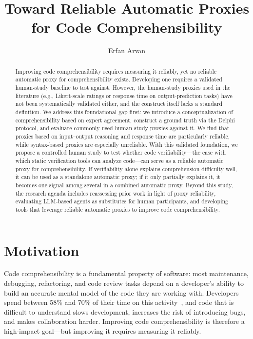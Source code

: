 \documentclass[sigplan,10pt,anonymous=false]{acmart}
\begin{document}
\title{Toward Reliable Automatic Proxies for Code Comprehensibility}

\author{Erfan Arvan}

\begin{abstract}
Improving code comprehensibility requires measuring it reliably, yet no
reliable automatic proxy for comprehensibility exists.
Developing one requires a validated human-study baseline to test against.
However, the human-study proxies used in the literature (e.g., Likert-scale
ratings or response time on output-prediction tasks) have not been
systematically validated either, and the construct itself lacks a standard
definition.
We address this foundational gap first: we introduce a conceptualization of
comprehensibility based on expert agreement, construct a ground truth via the
Delphi protocol, and evaluate commonly used human-study proxies against it.
We find that proxies based on input--output reasoning and response time are
particularly reliable, while syntax-based proxies are especially unreliable.
With this validated foundation, we propose a controlled human study to test
whether code verifiability---the ease with which static verification tools
can analyze code---can serve as a reliable automatic proxy for comprehensibility.
If verifiability alone explains comprehension difficulty well, it can be used
as a standalone automatic proxy; if it only partially explains it, it becomes
one signal among several in a combined automatic proxy.
Beyond this study, the research agenda includes reassessing prior work in
light of proxy reliability, evaluating LLM-based agents as substitutes for
human participants, and developing tools that leverage reliable automatic
proxies to improve code comprehensibility.
\end{abstract}

\maketitle

\section{Motivation}

Code comprehensibility is a fundamental property of software: most
maintenance, debugging, refactoring, and code review tasks depend on a
developer's ability to build an accurate mental model of the code they are
working with.
Developers spend between 58\% and 70\% of their time on this
activity~\cite{percent1,scalabrino2017automatically}, and code that is
difficult to understand slows development, increases the risk of introducing
bugs, and makes collaboration harder.
Improving code comprehensibility is therefore a high-impact goal---but
improving it requires measuring it reliably.
\end{document}
